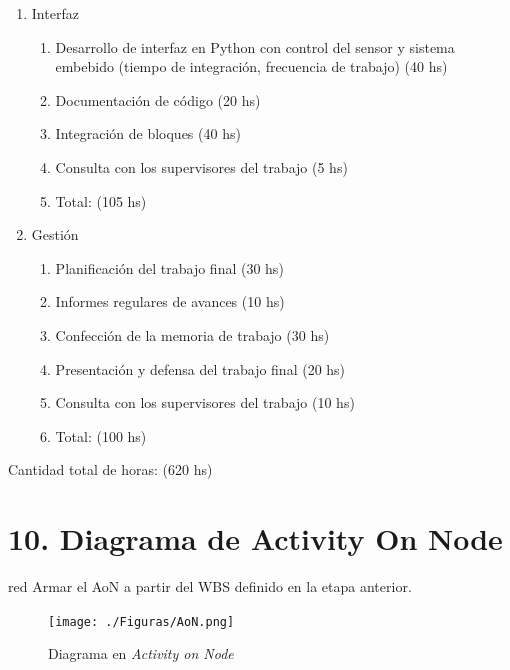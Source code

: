 \documentclass[
11pt, %
codirector, %
]{charter}
\begin{document}
\begin{enumerate}
\item Interfaz
	\begin{enumerate}
	\item Desarrollo de interfaz en Python con control del sensor y sistema embebido (tiempo de integración, frecuencia de trabajo) (40 hs)
	\item Documentación de código (20 hs)
	\item Integración de bloques (40 hs)
	\item Consulta con los supervisores del trabajo (5 hs)
	\item Total: (105 hs)	
	\end{enumerate}		

\item Gestión 
	\begin{enumerate}
	\item Planificación del trabajo final (30 hs)
	\item Informes regulares de avances (10 hs)
	\item Confección de la memoria de trabajo (30 hs)
	\item Presentación y defensa del trabajo final (20 hs)
	\item Consulta con los supervisores del trabajo (10 hs)
	\item Total: (100 hs)
	\end{enumerate}		
\end{enumerate}

Cantidad total de horas: (620 hs)


\section{10. Diagrama de Activity On Node}
\label{sec:AoN}

\begin{consigna}{red}
Armar el AoN a partir del WBS definido en la etapa anterior. 



\end{consigna}

\begin{figure}[htpb]
\centering 
\texttt{[image: ./Figuras/AoN.png]}
\caption{Diagrama en \textit{Activity on Node}}
\label{fig:AoN}
\end{figure}
\end{document}
